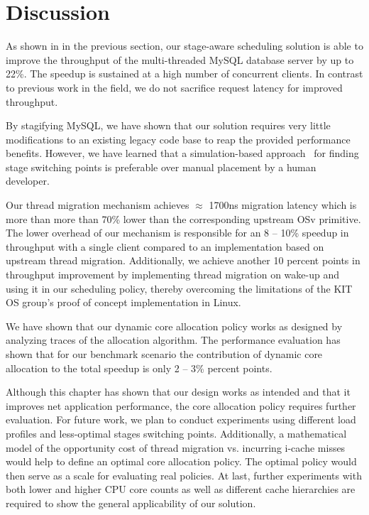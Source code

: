 \documentclass[12pt,a4paper]{book}
\begin{document}
\clearpage
\section{Discussion}\label{ch:eval:discussion}
As shown in in the previous section, our stage-aware scheduling solution is able to improve the throughput of the multi-threaded MySQL database server by up to 22\%.
The speedup is sustained at a high number of concurrent clients.
In contrast to previous work in the field, we do not sacrifice request latency for improved throughput.

By stagifying MySQL, we have shown that our solution requires very little modifications to an existing legacy code base to reap the provided performance benefits.
However, we have learned that a simulation-based approach~\cite{kitOSSFMA} for finding stage switching points is preferable over manual placement by a human developer.

Our thread migration mechanism achieves $\approx$ 1700ns migration latency which is more than more than 70\% lower than the corresponding upstream OSv primitive.
The lower overhead of our mechanism is responsible for an 8 -- 10\% speedup in throughput with a single client compared to an implementation based on upstream thread migration.
Additionally, we achieve another 10 percent points in throughput improvement by implementing thread migration on wake-up and using it in our scheduling policy, thereby overcoming the limitations of the KIT OS group's proof of concept implementation in Linux.

We have shown that our dynamic core allocation policy works as designed by analyzing traces of the allocation algorithm.
The performance evaluation has shown that for our benchmark scenario the contribution of dynamic core allocation to the total speedup is only 2 -- 3\% percent points.

Although this chapter has shown that our design works as intended and that it improves net application performance, the core allocation policy requires further evaluation.
For future work, we plan to conduct experiments using different load profiles and less-optimal stages switching points.
Additionally, a mathematical model of the opportunity cost of thread migration vs. incurring i-cache misses would help to define an optimal core allocation policy.
The optimal policy would then serve as a scale for evaluating real policies.
At last, further experiments with both lower and higher CPU core counts as well as different cache hierarchies are required to show the general applicability of our solution.
\end{document}
